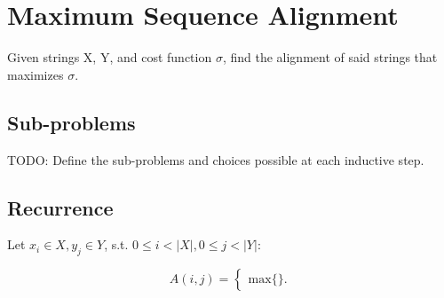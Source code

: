 \documentclass{article}
\begin{document}
	
\section{Maximum Sequence Alignment}
Given strings X, Y, and cost function $\sigma$, find the alignment of said strings that maximizes $\sigma$.

\subsection{Sub-problems}
TODO: Define the sub-problems and choices possible at each inductive step.

\subsection{Recurrence}
Let $x_i \in X, y_j \in Y$, s.t. $0 \leq i < |X|, 0 \leq j < |Y|$:

\begin{equation}
A(i,j)=			
\begin{cases}
\text{max} \{\}.
\end{cases}
\end{equation}
\end{document}

